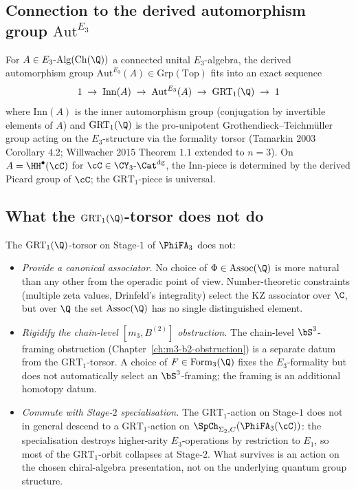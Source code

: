 \subsection*{Connection to the derived automorphism group $\mathrm{Aut}^{E_3}$}

\begin{proposition}
\label{prop:aut-e3-derived}
\ClaimStatusTheorem
For $A \in E_3\text{-}\mathrm{Alg}(\mathrm{Ch}(\Q))$ a connected unital $E_3$-algebra,
the derived automorphism group $\mathrm{Aut}^{E_3}(A) \in
\mathrm{Grp}(\mathrm{Top})$ fits into an exact sequence
\[
 1 \;\to\; \mathrm{Inn}(A) \;\to\; \mathrm{Aut}^{E_3}(A) \;\to\;
 \mathrm{GRT}_1(\Q) \;\to\; 1
\]
where $\mathrm{Inn}(A)$ is the inner automorphism group
(conjugation by invertible elements of $A$) and
$\mathrm{GRT}_1(\Q)$ is the pro-unipotent Grothendieck--Teichmüller
group acting on the $E_3$-structure via the formality torsor
(Tamarkin $2003$ Corollary $4.2$; Willwacher $2015$ Theorem $1.1$
extended to $n = 3$). On $A = \HH^\bullet(\cC)$ for
$\cC \in \CY_3\text{-}\Cat^{\mathrm{dg}}$, the $\mathrm{Inn}$-piece is
determined by the derived Picard group of $\cC$; the
$\mathrm{GRT}_1$-piece is universal.
\end{proposition}

\subsection*{What the $\mathrm{GRT}_1(\Q)$-torsor does not do}

\begin{remark}
\label{rem:grt1-torsor-non-trivialisations-d3}
The $\mathrm{GRT}_1(\Q)$-torsor on Stage-$1$ of $\PhiFA_3$ does not:
\begin{itemize}
\item \emph{Provide a canonical associator.} No choice of
$\Phi \in \mathrm{Assoc}(\Q)$ is more natural than any other from the
operadic point of view. Number-theoretic constraints (multiple zeta
values, Drinfeld's integrality) select the KZ associator over $\C$, but
over $\Q$ the set $\mathrm{Assoc}(\Q)$ has no single distinguished
element.
\item \emph{Rigidify the chain-level $[m_3, B^{(2)}]$ obstruction.}
The chain-level $\bS^3$-framing obstruction (Chapter~\ref{ch:m3-b2-obstruction})
is a separate datum from the $\mathrm{GRT}_1$-torsor. A choice of
$F \in \mathrm{Form}_3(\Q)$ fixes the $E_3$-formality but does not
automatically select an $\bS^3$-framing; the framing is an additional
homotopy datum.
\item \emph{Commute with Stage-$2$ specialisation.} The
$\mathrm{GRT}_1$-action on Stage-$1$ does not in general descend to a
$\mathrm{GRT}_1$-action on $\SpCh_{\Sigma_2, C}(\PhiFA_3(\cC))$: the
specialisation destroys higher-arity $E_3$-operations by restriction to
$E_1$, so most of the $\mathrm{GRT}_1$-orbit collapses at Stage-$2$.
What survives is an action on the chosen chiral-algebra presentation,
not on the underlying quantum group structure.
\end{itemize}
\end{remark}

